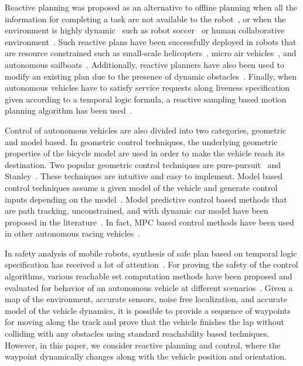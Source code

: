 Reactive planning was proposed as an alternative to offline planning when all the information for completing a task are not available to the robot~\cite{georgeff1987reactive}, or when the environment is highly dynamic~\cite{belkhouche2009reactive} such as robot soccer~\cite{bruce2002real} or human collaborative environment~\cite{dumonteil2015reactive}.
%
Such reactive plans have been successfully deployed in robots that are resource constrained such as small-scale helicopters~\cite{redding2007real}, micro air vehicles~\cite{sharma2012reactive}, and autonomous sailboats~\cite{petres2011reactive}.
%
Additionally, reactive planners have also been used to modify an existing plan due to the presence of dynamic obstacles~\cite{moreau2019reactive,moreau2019reactive-be}.
%
Finally, when autonomous vehicles have to satisfy service requests along liveness specification given according to a temporal logic formula, a reactive sampling based motion planning algorithm has been used~\cite{vasile2014reactive,vasile2020reactive}. 

Control of autonomous vehicles are also divided into two categories, geometric and model based. In geometric control techniques, the underlying geometric properties of the bicycle model are used in order to make the vehicle reach its destination. Two popular geometric control techniques are pure-pursuit~\cite{park2014development,Snider.2009} and Stanley~\cite{hoffmann2007autonomous}. These techniques are intuitive and easy to implement. 
%
Model based control techniques assume a given model of the vehicle and generate control inputs depending on the model~\cite{de1998feedback,murray1993nonholonomic}.
%
Model predictive control based methods that are path tracking, unconstrained, and with dynamic car model have been proposed in the literature~\cite{falcone2007predictive,falcone2008linear,raffo2009predictive}.
%
In fact, MPC based control methods have been used in other autonomous racing vehicles~\cite{talvala2011pushing}.

In safety analysis of mobile robots, synthesis of safe plan based on temporal logic specification has received a lot of attention~\cite{kress2009temporal,fainekos2009temporal,Kloetzertemp}. For proving the safety of the control algorithms, various reachable set computation methods have been proposed and evaluated for behavior of an autonomous vehicle at different scenarios~\cite{AlthoffDolan,LygerosSastry,ACCVerified,ACCTwoApproaches}. 
%
Given a map of the environment, accurate sensors, noise free localization, and accurate model of the vehicle dynamics, it is possible to provide a sequence of waypoints for moving along the track and prove that the vehicle finishes the lap without colliding with any obstacles using standard reachability based techniques. 
%
However, in this paper, we consider reactive planning and control, where the waypoint dynamically changes along with the vehicle position and orientation.

